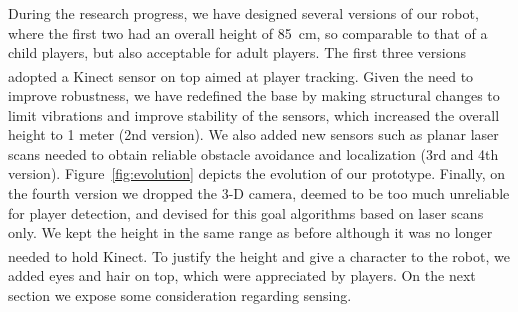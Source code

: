 During the research progress, we have designed several versions of our robot, where the first two had an overall height of 85~cm, so comparable to that of a child players, but also acceptable for adult players. The first three versions adopted a Kinect\textsuperscript{\textregistered} sensor on top aimed at player tracking. Given the need to improve robustness, we have redefined the base by making structural changes to limit vibrations and improve stability of the sensors, which increased the overall height to 1 meter (2nd version). We also added new sensors such as planar laser scans needed to obtain reliable obstacle avoidance and localization (3rd and 4th version). Figure~\ref{fig:evolution} depicts the evolution of our prototype. Finally, on the fourth version we dropped the 3-D camera, deemed to be too much unreliable for player detection, and devised for this goal algorithms based on laser scans only. We kept the height in the same range as before although it was no longer needed to hold Kinect\textsuperscript{\textregistered}. To justify the height and give a character to the robot, we added eyes and hair on top, which were appreciated by players. On the next section we expose some consideration regarding sensing.

